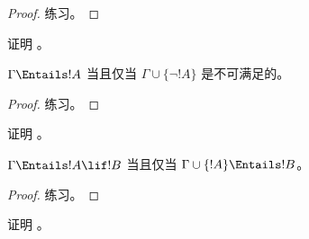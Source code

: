 \documentclass[../../../include/open-logic-section]{subfiles}
\begin{document}
\begin{proof}
练习。
\end{proof}

\begin{prob}
证明 。
\end{prob}

\begin{prop}
  $\Gamma \Entails !A$ 当且仅当 $\Gamma \cup \{\lnot !A\}$ 是不可满足的。
\end{prop}

\begin{proof}
练习。
\end{proof}

\begin{prob}
证明 。
\end{prob}

\begin{thm}[语义演绎定理]
   $\Gamma \Entails !A \lif !B$ 当且仅当 $\Gamma \cup \{!A\} \Entails !B$。
\end{thm}

\begin{proof}
练习。
\end{proof}

\begin{prob}
证明 。
\end{prob}
\end{document}
